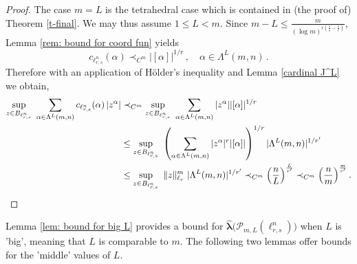 \documentclass[12pt]{amsart}
\numberwithin{subsection}{section}
\theoremstyle{definition}
\theoremstyle{remark}
\begin{document}
\begin{proof}
The case $m=L$ is the tetrahedral case which is  contained in (the proof of) Theorem \ref{t-final}. We may thus assume $1\le L<m.$
Since $m-L\le \frac{m}{(\log m)^{r(\frac1{s}-\frac1{r})}}$, Lemma \ref{rem: bound for coord fun} yields
\[
c_{\ell_{r,s}^n}(\alpha)
\prec_{C^m}  |[\alpha]|^{1/r}\,, \quad \alpha \in \Lambda^L(m,n)\,.
\]
Therefore with an application of H\"older's inequality and Lemma \ref{cardinal J^L} we obtain,
\begin{align*}
\sup_{z\in B_{\ell_{r,s}^n}}\,\,\sum_{\alpha \in \Lambda^L(m,n)}  c_{\ell_{r,s}^n}(\alpha) \,|z^\alpha |
& \prec_{C^m} \sup_{z\in B_{\ell_{r,s}^n}}\,\,\sum_{\alpha \in \Lambda^L  (m,n)} |z^\alpha| |[\alpha]|^{1/r}
\\
&
\le \sup_{z\in B_{\ell_{r,s}^n}}\,\,\left( \sum_{\alpha \in \Lambda^L  (m,n)} |z^\alpha|^r |[\alpha]| \right)^{1/r} | \Lambda^L  (m,n) |^{1/r'}
\\
& \le \sup_{z\in B_{\ell_{r,s}^n}}\,\,\| z  \|_{\ell_r}^m \,\, | \Lambda^L  (m,n) |^{1/r'}
 \prec_{C^m}  \Big(\frac{n}{L}\Big)^{\frac{L}{r'}} \prec_{C^m}  \Big(\frac{n}{m}\Big)^{\frac{m}{r'}}\,.\label{final bound for L>m-sqrt(m)}
\qedhere
\end{align*}
\end{proof}

Lemma \ref{lem: bound for big L} provides a bound for \( \widehat{\boldsymbol{\lambda}}\big(\mathcal{P}_{m,L}(\ell_{r,s}^n)\big) \) when \( L \) is 'big', meaning that \( L \) is comparable to \( m \). The following two lemmas offer bounds for the 'middle' values of \( L \).
\end{document}
